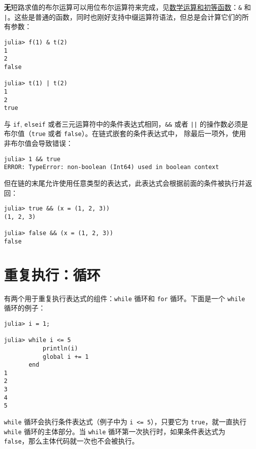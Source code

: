 \textbf{无}短路求值的布尔运算可以用位布尔运算符来完成，见\hyperlink{16865688524696028421}{数学运算和初等函数}：\texttt{\&} 和 \texttt{|}。这些是普通的函数，同时也刚好支持中缀运算符语法，但总是会计算它们的所有参数：




\begin{verbatim}
julia> f(1) & t(2)
1
2
false

julia> t(1) | t(2)
1
2
true
\end{verbatim}



与 \texttt{if}, \texttt{elseif} 或者三元运算符中的条件表达式相同，\texttt{\&\&} 或者 \texttt{||} 的操作数必须是布尔值（\texttt{true} 或者 \texttt{false}）。在链式嵌套的条件表达式中， 除最后一项外，使用非布尔值会导致错误：




\begin{verbatim}
julia> 1 && true
ERROR: TypeError: non-boolean (Int64) used in boolean context
\end{verbatim}



但在链的末尾允许使用任意类型的表达式，此表达式会根据前面的条件被执行并返回：




\begin{verbatim}
julia> true && (x = (1, 2, 3))
(1, 2, 3)

julia> false && (x = (1, 2, 3))
false
\end{verbatim}



\hypertarget{6800841505698205300}{}


\section{重复执行：循环}



有两个用于重复执行表达式的组件：\texttt{while} 循环和 \texttt{for} 循环。下面是一个 \texttt{while} 循环的例子：




\begin{verbatim}
julia> i = 1;

julia> while i <= 5
           println(i)
           global i += 1
       end
1
2
3
4
5
\end{verbatim}



\texttt{while} 循环会执行条件表达式（例子中为 \texttt{i <= 5}），只要它为 \texttt{true}，就一直执行\texttt{while} 循环的主体部分。当 \texttt{while} 循环第一次执行时，如果条件表达式为 \texttt{false}，那么主体代码就一次也不会被执行。



